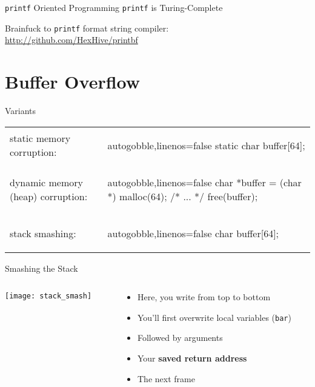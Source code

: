\documentclass[beamer]{uibk}
\begin{document}
\begin{frame}{\texttt{printf} Oriented Programming}
    \texttt{printf} is Turing-Complete
    \bigskip

    Brainfuck to \texttt{printf} format string compiler:\\
    \url{http://github.com/HexHive/printbf}
\end{frame}

\section{Buffer Overflow}

\begin{frame}[fragile]{Variants}
    \begin{tabular}{p{} p{}}
        static memory corruption: &
        \begin{ccode*}{autogobble,linenos=false}
            static char buffer[64];
        \end{ccode*}
        \bigskip\\
        dynamic memory (heap) corruption: &
        \begin{ccode*}{autogobble,linenos=false}
            char *buffer = (char *) malloc(64);
            /* ... */
            free(buffer);
        \end{ccode*}
        \bigskip\\
        stack smashing: &
        \begin{ccode*}{autogobble,linenos=false}
            char buffer[64];
        \end{ccode*}
    \end{tabular}
\end{frame}

\begin{frame}{Smashing the Stack}
    \begin{columns}
        \begin{column}{0.5\textwidth}
            \begin{center}
                \texttt{[image: stack\_smash]}
            \end{center}
        \end{column}
        \begin{column}{0.5\textwidth}
            \begin{itemize}
                \item Here, you write from top to bottom \bigskip
                \item You'll first overwrite local variables (\texttt{bar}) \bigskip
                \item Followed by arguments \bigskip
                \item Your \textbf{saved return address} \bigskip
                \item The next frame
            \end{itemize}
        \end{column}
    \end{columns}
\end{frame}
\end{document}
